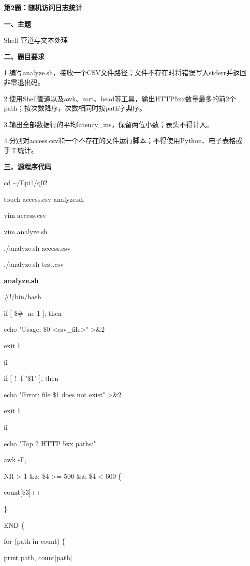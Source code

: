 \documentclass[12pt,a4paper]{article}
\newcommand{\ul}[1]{\underline{#1}}
\begin{document}
\vspace{1em}
\textbf{第2题：随机访问日志统计}

\vspace{0.6em}
\textbf{一、主题}

Shell 管道与文本处理

\vspace{0.6em}
\textbf{二、题目要求}

1.编写analyze.sh，接收一个CSV文件路径；文件不存在时将错误写入stderr并返回非零退出码。

2.使用Shell管道以及awk、sort、head等工具，输出HTTP5xx数量最多的前2个path；按次数降序，次数相同时按path字典序。

3.输出全部数据行的平均latency\_ms，保留两位小数；表头不得计入。

4.分别对access.csv和一个不存在的文件运行脚本；不得使用Python、电子表格或手工统计。

\vspace{0.6em}
\textbf{三、源程序代码}

cd \textasciitilde/Epi1/q02

touch access.csv analyze.sh

vim access.csv

vim analyze.sh

./analyze.sh access.csv

./analyze.sh test.csv

\textbf{\ul{analyze.sh}}

\#!/bin/bash

if {[} \$\# -ne 1 {]}; then

echo "Usage: \$0 \textless csv\_file\textgreater" \textgreater\&2

exit 1

fi

if {[} ! -f "\$1" {]}; then

echo "Error: file \textquotesingle\$1\textquotesingle{} does not exist"
\textgreater\&2

exit 1

fi

echo "Top 2 HTTP 5xx paths:"

awk -F, \textquotesingle{}

NR \textgreater{} 1 \&\& \$4 \textgreater= 500 \&\& \$4 \textless{} 600
\{

count{[}\$3{]}++

\}

END \{

for (path in count) \{

print path, count{[}path{]}
\end{document}
